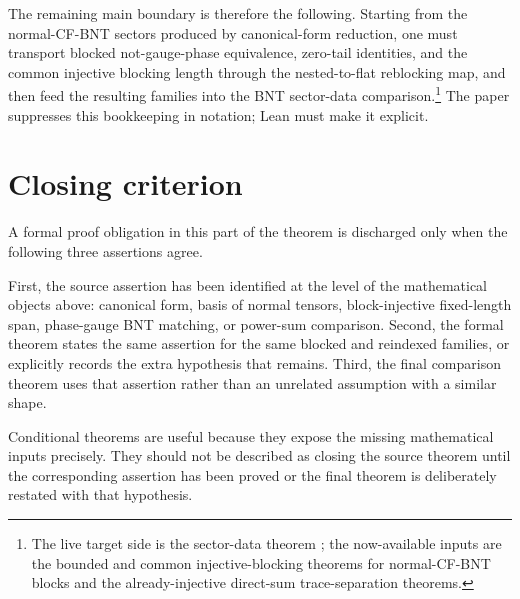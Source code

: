 \documentclass{article}
\begin{document}
The remaining main boundary is therefore the following. Starting from the
normal-CF-BNT sectors produced by canonical-form reduction, one must transport
blocked not-gauge-phase equivalence, zero-tail identities, and the common
injective blocking length through the nested-to-flat reblocking map, and then
feed the resulting families into the BNT sector-data comparison.\footnote{%
The live target side is the sector-data theorem
; the now-available inputs are
the bounded and common injective-blocking theorems for normal-CF-BNT blocks and
the already-injective direct-sum trace-separation theorems.}  The
paper suppresses this bookkeeping in notation; Lean must make it explicit.

\section{Closing criterion}

A formal proof obligation in this part of the theorem is discharged only when the
following three assertions agree.

First, the source assertion has been identified at the level of the mathematical
objects above: canonical form, basis of normal tensors, block-injective
fixed-length span, phase-gauge BNT matching, or power-sum comparison. Second,
the formal theorem states the same assertion for the same blocked and reindexed
families, or explicitly records the extra hypothesis that remains. Third, the
final comparison theorem uses that assertion rather than an unrelated assumption
with a similar shape.

Conditional theorems are useful because they expose the missing mathematical
inputs precisely. They should not be described as closing the source theorem
until the corresponding assertion has been proved or the final theorem is
deliberately restated with that hypothesis.



\end{document}

